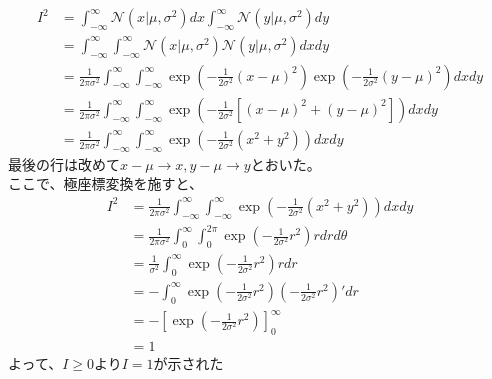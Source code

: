 \documentclass[a4j,dvipdfmx]{jsarticle}
\begin{document}
\begin{align*}
    I^2 &= \int_{-\infty}^{\infty} \mathcal{N}(x|\mu, \sigma^2) dx \int_{-\infty}^{\infty} \mathcal{N}(y|\mu, \sigma^2) dy\\
    &= \int_{-\infty}^{\infty} \int_{-\infty}^{\infty} \mathcal{N}(x|\mu, \sigma^2) \mathcal{N}(y|\mu, \sigma^2) dxdy\\
    &= \frac{1}{2\pi\sigma^2} \int_{-\infty}^{\infty} \int_{-\infty}^{\infty} 
    \exp \left( -\frac{1}{2\sigma^2}(x-\mu)^2 \right) \exp \left( -\frac{1}{2\sigma^2}(y-\mu)^2 \right) dxdy \\
    &= \frac{1}{2\pi\sigma^2} \int_{-\infty}^{\infty} \int_{-\infty}^{\infty} 
    \exp \left( -\frac{1}{2\sigma^2} \left[ (x-\mu)^2 + (y-\mu)^2 \right] \right) dxdy \\
    &= \frac{1}{2\pi\sigma^2} \int_{-\infty}^{\infty} \int_{-\infty}^{\infty} 
    \exp \left( -\frac{1}{2\sigma^2} (x^2 + y^2) \right) dxdy
\end{align*}
最後の行は改めて$x-\mu\rightarrow x, y-\mu\rightarrow y$とおいた。\\
ここで、極座標変換を施すと、
\begin{align*}
    I^2 &= \frac{1}{2\pi\sigma^2} \int_{-\infty}^{\infty} \int_{-\infty}^{\infty}
    \exp \left( -\frac{1}{2\sigma^2} (x^2 + y^2) \right) dxdy \\
    &= \frac{1}{2\pi\sigma^2} \int_{0}^{\infty} \int_{0}^{2\pi}
    \exp \left( -\frac{1}{2\sigma^2} r^2 \right) r drd\theta \\
    &= \frac{1}{\sigma^2} \int_{0}^{\infty} \exp \left( -\frac{1}{2\sigma^2} r^2 \right) r dr \\
    &= - \int_{0}^{\infty} \exp \left( -\frac{1}{2\sigma^2} r^2 \right) \left( -\frac{1}{2\sigma^2} r^2 \right)' dr \\
    &= - \left[ \exp \left( -\frac{1}{2\sigma^2} r^2 \right) \right]_0^{\infty} \\
    &= 1
\end{align*}
よって、$I \ge 0$より$I=1$が示された
\end{document}
